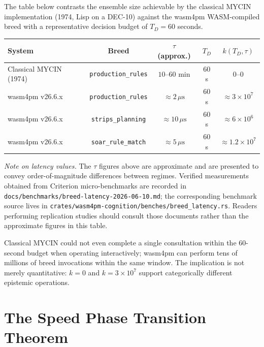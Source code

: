 \begin{example}
\label{ex:classical-vs-wasm}
The table below contrasts the ensemble size achievable by the classical MYCIN implementation
(1974, Lisp on a DEC-10) against the wasm4pm WASM-compiled breed with a representative
decision budget of $T_D = 60$ seconds.

\begin{center}
\begin{tabular}{lcccc}
\hline
\textbf{System} & \textbf{Breed} & \textbf{$\tau$ (approx.)} & \textbf{$T_D$} & \textbf{$k(T_D,\tau)$} \\
\hline
Classical MYCIN (1974)  & \texttt{production\_rules} & $10$--$60$ min & $60$ s  & $0$--$0$   \\
wasm4pm v26.6.x         & \texttt{production\_rules} & $\approx 2\,\mu\text{s}$ & $60$ s  & $\approx 3 \times 10^7$ \\
wasm4pm v26.6.x         & \texttt{strips\_planning}  & $\approx 10\,\mu\text{s}$ & $60$ s  & $\approx 6 \times 10^6$ \\
wasm4pm v26.6.x         & \texttt{soar\_rule\_match} & $\approx 5\,\mu\text{s}$  & $60$ s  & $\approx 1.2 \times 10^7$ \\
\hline
\end{tabular}
\end{center}

\smallskip
\noindent
\emph{Note on latency values.}  The $\tau$ figures above are approximate and are presented
to convey order-of-magnitude differences between regimes.  Verified measurements obtained
from Criterion micro-benchmarks are recorded in
\texttt{docs/benchmarks/breed-latency-2026-06-10.md}; the corresponding benchmark source
lives in \texttt{crates/wasm4pm-cognition/benches/breed\_latency.rs}.  Readers performing
replication studies should consult those documents rather than the approximate figures in
this table.

Classical MYCIN could not even complete a single consultation within the 60-second budget
when operating interactively; wasm4pm can perform tens of millions of breed invocations
within the same window.  The implication is not merely quantitative: $k = 0$ and
$k = 3 \times 10^7$ support categorically different epistemic operations.
\end{example}

\section{The Speed Phase Transition Theorem}
\label{sec:phase-transition}

